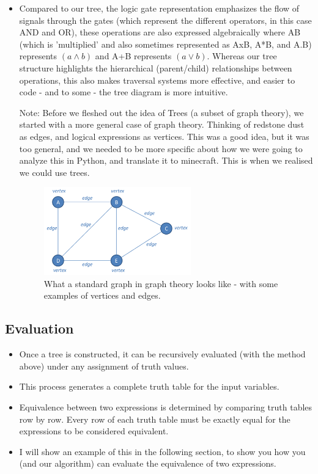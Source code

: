 \documentclass[11pt]{diazessay} %
\begin{document}
\begin{itemize}
\item Compared to our tree, the logic gate representation emphasizes the flow of signals through the gates (which represent the different operators, in this case AND and OR), these operations are also expressed algebraically where AB (which is 'multiplied' and also sometimes represented as AxB, A*B, and A.B) represents $(a \wedge b)$ and A+B represents $(a \vee b)$. Whereas our tree structure highlights the hierarchical (parent/child) relationships between operations, this also makes traversal systems more effective, and easier to code - and to some - the tree diagram is more intuitive.
\medskip

\subitem *Note: Before we fleshed out the idea of Trees (a subset of graph theory), we started with a more general case of graph theory. Thinking of redstone dust as edges, and logical expressions as vertices. This was a good idea, but it was too general, and we needed to be more specific about how we were going to analyze this in Python, and translate it to minecraft. This is when we realised we could use trees.
    \begin{figure}[h]
        \centering
        \includegraphics[width=0.6\textwidth]{gt.png}
        \caption{What a standard graph in graph theory looks like - with some examples of vertices and edges.}
        \label{fig:graph_theory_example}
    \end{figure}
\end{itemize}

\subsection*{Evaluation}
\begin{itemize}
    \item Once a tree is constructed, it can be recursively evaluated (with the method above) under any 
    assignment of truth values. 
    \item This process generates a complete truth table for the input variables.
    \item Equivalence between two expressions is determined by comparing truth 
    tables row by row. Every row of each truth table must be exactly equal for the expressions to be considered equivalent.
	\item I will show an example of this in the following section, to show you how you (and our algorithm) can evaluate the equivalence of two expressions.
\end{itemize}
\end{document}
